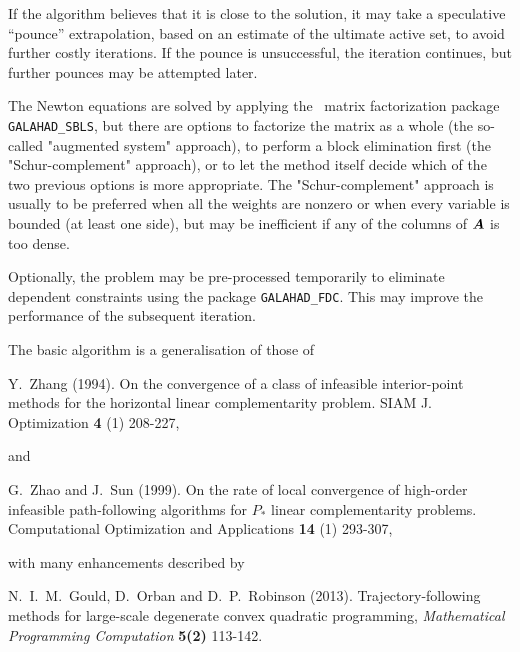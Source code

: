 \documentclass{galahad}
\begin{document}
If the algorithm believes that it is close to the solution, it may take a
speculative ``pounce'' extrapolation, based on an estimate of the ultimate 
active set, to avoid further costly iterations. If the pounce is unsuccessful, 
the iteration continues, but further pounces may be attempted later.

The Newton equations are solved  by applying the
\galahad\ matrix factorization package
{\tt GALAHAD\_SBLS}, but there are options
to factorize the matrix as a whole (the so-called "augmented system"
approach), to perform a block elimination first (the "Schur-complement"
approach), or to let the method itself decide which of the two
previous options is more appropriate.
The "Schur-complement" approach is usually to be preferred when all the
weights are nonzero or when every variable is bounded (at least one side),
but may be inefficient if any of the columns of ${\bm{A}}$ is too dense.

Optionally, the problem may be pre-processed temporarily to eliminate dependent
constraints using the package {\tt GALAHAD\_FDC}. This may improve the
performance of the subsequent iteration.

\vspace*{1mm}

\galreferences
\vspace*{1mm}

\noindent
The basic algorithm is a generalisation of those of
\vspace*{1mm}

\noindent
Y.\ Zhang (1994).
On the convergence of a class of infeasible interior-point methods for the
horizontal linear complementarity problem.
SIAM J. Optimization {\bf 4} (1) 208-227,
\vspace*{1mm}

\noindent
and

\noindent
G.\ Zhao and J.\ Sun (1999).
On the rate of local convergence of high-order
infeasible path-following algorithms for $P_*$ linear complementarity
problems.
Computational Optimization and Applications {\bf 14} (1) 293-307,
\vspace*{1mm}

\noindent
with many enhancements described by
\vspace*{1mm}

\noindent
N.\ I.\ M.\ Gould, D.\ Orban and D.\ P.\ Robinson (2013).
Trajectory-following methods for
large-scale  degenerate convex quadratic programming,
{\em Mathematical Programming Computation} {\bf 5(2)}
113-142.
\end{document}

